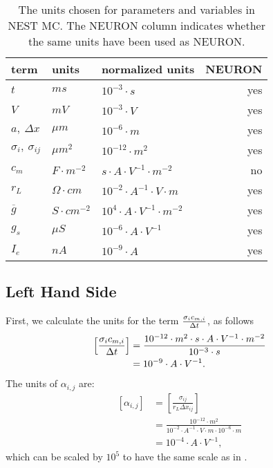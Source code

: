 \begin{table}[hp!]
\begin{tabular}{lllr}
    \hline
    term                      &   units                 &  normalized units                         & NEURON \\
    \hline
    $t$                       &   $ms$                  &  $10^{-3} \cdot s$                        & yes    \\
    $V$                       &   $mV$                  &  $10^{-3} \cdot V$                        & yes    \\
    $a,~\Delta x$             &   $\mu m$               &  $10^{-6} \cdot m$                        & yes    \\
    $\sigma_{i},~\sigma_{ij}$ &   $\mu m^2$             &  $10^{-12} \cdot m^2$                     & yes    \\
    $c_m$                     &   $F\cdot m^{-2}$       &  $s\cdot A\cdot V^{-1}\cdot m^{-2}$       & no     \\
    $r_L$                     &   $\Omega\cdot cm$      &  $10^{-2} \cdot A^{-1}\cdot V\cdot m$     & yes    \\
    $\overline{g}$            &   $S\cdot cm^{-2}$      &  $10^{4} \cdot A\cdot V^{-1}\cdot m^{-2}$ & yes    \\
    $g_s$                     &   $\mu S$               &  $10^{-6} \cdot A\cdot V^{-1}$            & yes    \\
    $I_e$                     &   $nA$                  &  $10^{-9} \cdot A$                        & yes    \\
    \hline
\end{tabular}
\caption{The units chosen for parameters and variables in NEST MC. The NEURON column indicates whether the same units have been used as NEURON.}
\label{tbl:units}
\end{table}

\subsection{Left Hand Side}
First, we calculate the units for the term $\frac{\sigma_i c_{m,i}}{\Delta t}$, as follows
\begin{align}
    \left[ \frac{\sigma_i c_{m,i}}{\Delta t} \right]
        &=
    \frac{10^{-12}\cdot m^2 \cdot s\cdot A\cdot V^{-1}\cdot m^{-2} } {10^{-3}\cdot s}
            \nonumber \\
        &=
    10^{-9} \cdot A \cdot V^{-1}. \label{eq:units_lhs_diag}
\end{align}
The units of $\alpha_{i,j}$ are:
\begin{align}
    \left[ \alpha_{i,j} \right]
        &=
    \left[ \frac{\sigma_{ij}}{ r_L \Delta x_{ij}} \right] \nonumber \\
        &=
    \frac{10^{-12}\cdot m^2}{ 10^{-2} \cdot A^{-1}\cdot V\cdot m \cdot 10^{-6}\cdot m}
        \nonumber \\
        &=
    10^{-4}\cdot A \cdot V^{-1}, \label{eq:units_lhs_lu}
\end{align}
which can be scaled by $10^{5}$ to have the same scale as in .

